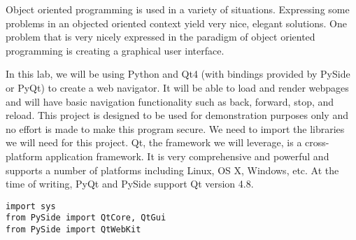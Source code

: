 
Object oriented programming is used in a variety of situations.
Expressing some problems in an objected oriented context yield very nice, elegant solutions.
One problem that is very nicely expressed in the paradigm of object oriented programming is creating a graphical user interface.

In this lab, we will be using Python and Qt4 (with bindings provided by PySide or PyQt) to create a web navigator.
It will be able to load and render webpages and will have basic navigation functionality such as back, forward, stop, and reload.
This project is designed to be used for demonstration purposes only and no effort is made to make this program secure.
We need to import the libraries we will need for this project.
Qt, the framework we will leverage, is a cross-platform application framework.
It is very comprehensive and powerful and supports a number of platforms including Linux, OS X, Windows, etc.
At the time of writing, PyQt and PySide support Qt version 4.8.
\begin{lstlisting}
import sys
from PySide import QtCore, QtGui
from PySide import QtWebKit
\end{lstlisting}

